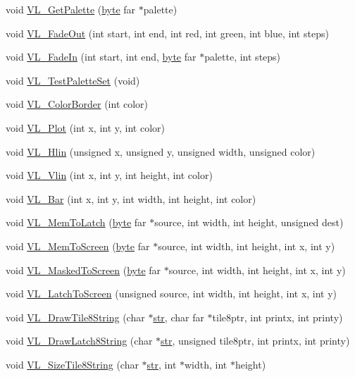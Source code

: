 \begin{DoxyCompactItemize}
\item 
void \hyperlink{ID__VL_8C_a9bcb5eb78f4668f31cc3ebcaec2d8e1b}{VL\_\-GetPalette} (\hyperlink{ID__HEAD_8H_a0c8186d9b9b7880309c27230bbb5e69d}{byte} far $\ast$palette)
\item 
void \hyperlink{ID__VL_8C_a03069f779ef1392c1d130618114c8783}{VL\_\-FadeOut} (int start, int end, int red, int green, int blue, int steps)
\item 
void \hyperlink{ID__VL_8C_a2f911632b5e47f727e64787b40e8781b}{VL\_\-FadeIn} (int start, int end, \hyperlink{ID__HEAD_8H_a0c8186d9b9b7880309c27230bbb5e69d}{byte} far $\ast$palette, int steps)
\item 
void \hyperlink{ID__VL_8C_a29a9e236524d106d97e319b43ade47fa}{VL\_\-TestPaletteSet} (void)
\item 
void \hyperlink{ID__VL_8C_a894ae8ddb88f5bcd4a18fe7082a441e4}{VL\_\-ColorBorder} (int color)
\item 
void \hyperlink{ID__VL_8C_af6832bc9cfe83972291dcb2d9143fbe6}{VL\_\-Plot} (int x, int y, int color)
\item 
void \hyperlink{ID__VL_8C_a0e9e36346595a9d3080888a54e9bab32}{VL\_\-Hlin} (unsigned x, unsigned y, unsigned width, unsigned color)
\item 
void \hyperlink{ID__VL_8C_add1ee903f12ff9e8c9c9baff950abcdd}{VL\_\-Vlin} (int x, int y, int height, int color)
\item 
void \hyperlink{ID__VL_8C_ae4d749f6bd2e011c5ef11165d2f2b433}{VL\_\-Bar} (int x, int y, int width, int height, int color)
\item 
void \hyperlink{ID__VL_8C_aa3a8bd4100a1d27c2680fa2799536ca7}{VL\_\-MemToLatch} (\hyperlink{ID__HEAD_8H_a0c8186d9b9b7880309c27230bbb5e69d}{byte} far $\ast$source, int width, int height, unsigned dest)
\item 
void \hyperlink{ID__VL_8C_a9395a541fc6c21a2d7e7d8b4932d134e}{VL\_\-MemToScreen} (\hyperlink{ID__HEAD_8H_a0c8186d9b9b7880309c27230bbb5e69d}{byte} far $\ast$source, int width, int height, int x, int y)
\item 
void \hyperlink{ID__VL_8C_a1ac9dd60b620514ade73c12fe349b913}{VL\_\-MaskedToScreen} (\hyperlink{ID__HEAD_8H_a0c8186d9b9b7880309c27230bbb5e69d}{byte} far $\ast$source, int width, int height, int x, int y)
\item 
void \hyperlink{ID__VL_8C_a80443116a2a895fc294adfe9b2220819}{VL\_\-LatchToScreen} (unsigned source, int width, int height, int x, int y)
\item 
void \hyperlink{ID__VL_8C_aba3f9a475bb578429bdc03681f9c14de}{VL\_\-DrawTile8String} (char $\ast$\hyperlink{WL__MAIN_8C_aaa970ecb4bbdf1eeaf97691045aaf8b5}{str}, char far $\ast$tile8ptr, int printx, int printy)
\item 
void \hyperlink{ID__VL_8C_a9680287be27cd138b273267d21bdb148}{VL\_\-DrawLatch8String} (char $\ast$\hyperlink{WL__MAIN_8C_aaa970ecb4bbdf1eeaf97691045aaf8b5}{str}, unsigned tile8ptr, int printx, int printy)
\item 
void \hyperlink{ID__VL_8C_af01da85944467c664d21473141c74977}{VL\_\-SizeTile8String} (char $\ast$\hyperlink{WL__MAIN_8C_aaa970ecb4bbdf1eeaf97691045aaf8b5}{str}, int $\ast$width, int $\ast$height)
\end{DoxyCompactItemize}
